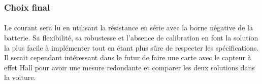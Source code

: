 	\subsubsection*{Choix final}
	\paragraph*{}
	Le courant sera lu en utilisant la résistance en série avec la borne négative de la batterie. Sa flexibilité, sa robustesse et l'absence de calibration en font la solution la plus facile à implémenter tout en étant plus sûre de respecter les spécifications. Il serait cependant intéressant dans le futur de faire une carte avec le capteur à effet Hall pour avoir une mesure redondante et comparer les deux solutions dans la voiture.	
		